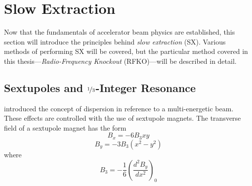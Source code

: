 \documentclass[a4paper,twoside,11pt]{report}
\begin{document}
\section{Slow Extraction}\label{sx}
Now that the fundamentals of accelerator beam physics are established, this section will introduce the principles behind \textit{slow extraction} (SX). Various methods of performing SX will be covered, but the particular method covered in this thesis---\textit{Radio-Frequency Knockout} (RFKO)---will be described in detail.

\subsection{Sextupoles and $\nicefrac 13$-Integer Resonance}

 introduced the concept of dispersion in reference to a multi-energetic beam. These effects are controlled with the use of sextupole magnets. The transverse field of a sextupole magnet has the form~\cite[Ch.2.4]{PIMMS}
\begin{equation}
  B_x = -6B_3xy
\end{equation}
\begin{equation}
  B_y = -3B_3(x^2-y^2)
\end{equation} where
\begin{equation}
  B_3=-\frac 16\left(\frac{d^2B_y}{dx^2}\right)_0
\end{equation}
\end{document}
